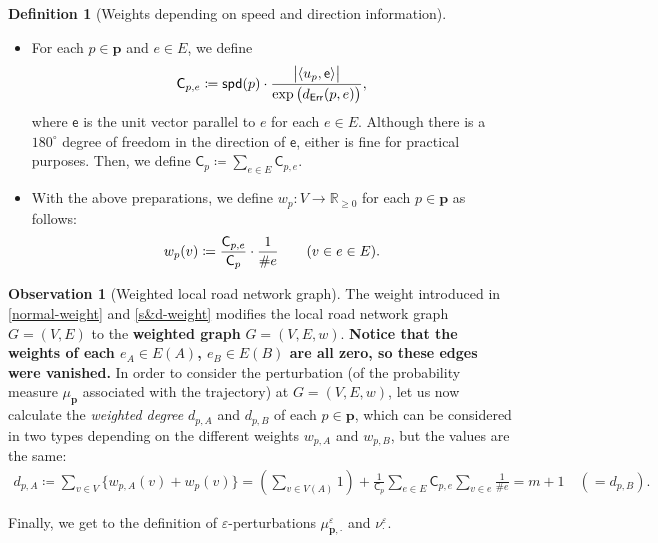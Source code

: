 \documentclass{article}
\numberwithin{equation}{section}
\theoremstyle{definition}
\newtheorem{definition}{Definition}[section]
\newtheorem{observation}[observation]{Observation}
\newcommand{\ee}{\mathsf{e}}
\newcommand{\cc}{\mathsf{C}}
\newcommand{\err}{\mathsf{Err}}
\DeclarePairedDelimiter{\abs}{\lvert}{\rvert}
\newcommand{\R}{\mathbb{R}}
\newcommand{\eps}{\varepsilon} %
\newcommand{\spd}{\mathsf{spd}}
\def\:={\coloneqq} %
\begin{document}
\begin{definition}[Weights depending on speed and direction information] \label{s&d-weight}
$ $\newline
\begin{itemize} \vspace{-6mm}
    \item For each $p\in\mathbf{p}$ and $e\in E$, we define 
    \begin{align*}
        \cc_{p,e}\:= \spd(p)\cdot\frac{\abs[\big]{\langle u_p,\ee \rangle}}{\exp\big(d_\err(p,e)\big)},
    \end{align*}
    where $\ee$ is the unit vector parallel to $e$ for each $e\in E$.
    Although there is a $180^\circ$ degree of freedom in the direction of $\ee$, either is fine for practical purposes.
    Then, we define $\cc_p\:=\sum_{e\in E}\cc_{p,e}$.
    \item With the above preparations, we define $w_p:V\to\R_{\ge0}$ for each $p\in\mathbf{p}$ as follows:
    \begin{align*} \vspace{-6mm}
    w_p(v) \:=
    \frac{\cc_{p,e}}{\cc_p}\cdot\frac{1}{\#e} \qquad (v\in e\in E).
    \end{align*} 
    \end{itemize}
\end{definition}

\begin{observation}[Weighted local road network graph]
The weight introduced in \autoref{normal-weight} and \autoref{s&d-weight} modifies the local road network graph $G=(V,E)$ to the \textbf{weighted graph} $G=(V,E,w)$.
\textbf{Notice that the weights of each $e_A\in E(A)$, $e_B\in E(B)$ are all zero, so these edges were vanished.}
In order to consider the perturbation (of the probability measure $\mu_{\mathbf{p}}$ associated with the trajectory) at $G=(V,E,w)$, let us now calculate the \emph{weighted degree} $d_{p,A}$ and $d_{p,B}$ of each $p\in\mathbf{p}$, which can be considered in two types depending on the different weights $w_{p,A}$ and $w_{p,B}$, but the values are the same:
\begin{align*}
    d_{p,A} \:= 
    \sum_{v\in V} \big\{ w_{p,A}(v)+w_p(v) \big\} =
    \left(\sum_{v\in V(A)}1\right) + \frac{1}{\cc_p} \sum_{e\in E} \cc_{p,e} \sum_{v\in e} \frac{1}{\#e}
    = m+1 \quad (=d_{p,B}).
\end{align*}
\end{observation}

Finally, we get to the definition of $\eps$-perturbations $\mu_{\mathbf{p},\cdot}^\eps$ and $\nu_\cdot^\eps$.
\end{document}

